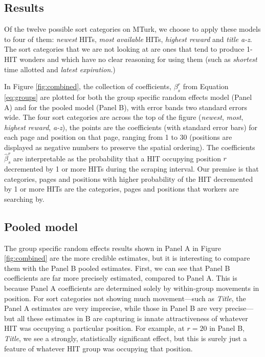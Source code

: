 \documentclass{acm_proc_article-sp}
\begin{document}
\subsection{Results}
\begin{figure*}
  \centering 
  \caption{Effects of position in sort category on HIT
    disappearance. Pages are illustrated with
    color. \label{fig:combined}}
\end{figure*} 

Of the twelve possible sort categories on MTurk, we choose to apply
these models to four of them: {\em newest} HITs, {\em most available}
HITs, {\em highest reward} and {\em title a-z}. The sort categories
that we are not looking at are ones that tend to produce 1-HIT wonders
and which have no clear reasoning for using them (such as {\em
  shortest} time allotted and {\em latest expiration}.)

In Figure \ref{fig:combined}, the collection of coefficients,
$\beta^r_s$ from Equation \ref{eq:groups} are plotted for both the
group specific random effects model (Panel A) and for the pooled model
(Panel B), with error bands two standard errors wide. The four sort
categories are across the top of the figure ({\em newest}, {\em most},
{\em highest reward}, {\em a-z}), the points are the coefficients
(with standard error bars) for each page and position on that page,
ranging from 1 to 30 (positions are displayed as negative numbers to
preserve the spatial ordering).  The coefficients $\hat{\beta}^r_s$
are interpretable as the probability that a HIT occupying position $r$
decremented by 1 or more HITs during the scraping interval. Our
premise is that categories, pages and positions with higher
probability of the HIT decremented by 1 or more HITs are the
categories, pages and positions that workers are searching by.


\subsection{Pooled model}
The group specific random effects results shown in Panel A in Figure
\ref{fig:combined} are the more credible estimates, but it is
interesting to compare them with the Panel B pooled estimates. First, we
can see that Panel B coefficients are far more precisely estimated,
compared to Panel A. This is because Panel A coefficients are
determined solely by within-group movements in position. For sort
categories not showing much movement---such as {\em Title}, the Panel
A estimates are very imprecise, while those in Panel B are very
precise---but all these estimates in B are capturing is innate
attractiveness of whatever HIT was occupying a particular
position. For example, at $r=20$ in Panel B, {\em Title}, we see a
strongly, statistically significant effect, but this is surely just a
feature of whatever HIT group was occupying that position.
\end{document}
